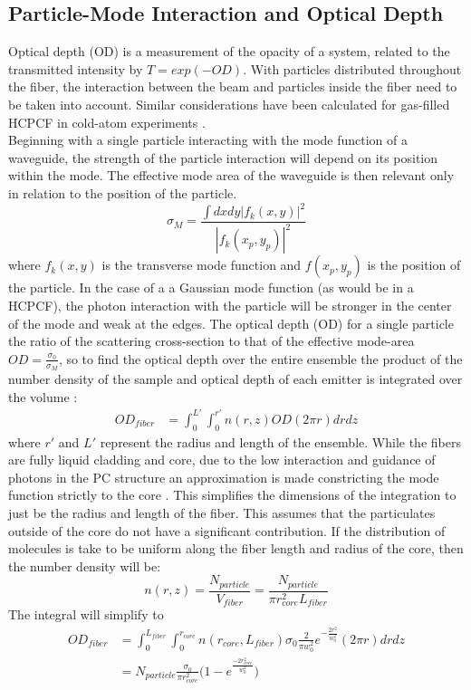 \subsection{Particle-Mode Interaction and Optical Depth}
Optical depth (OD) is a measurement of the opacity of a system, related to the transmitted intensity by $T = exp(-OD)$. With particles distributed throughout the fiber, the interaction between the beam and particles inside the fiber need to be taken into account. Similar considerations have been calculated for gas-filled HCPCF in cold-atom experiments \cite{bajcsy, hilton}.\\
Beginning with a single particle interacting with the mode function of a waveguide, the strength of the particle interaction will depend on its position within the mode\cite{domokos, mazoni}. The effective mode area of the waveguide is then relevant only in relation to the position of the particle. 
\begin{equation}
	\sigma_M = \frac{\int dxdy|f_k(x, y)|^2}{|f_k(x_p, y_p)|^2}
\end{equation}
where $f_k(x,y)$ is the transverse mode function and $f(x_p,y_p )$ is the position of the particle. In the case of a a Gaussian mode function (as would be in a HCPCF), the photon interaction with the particle will be stronger in the center of the mode and weak at the edges. The optical depth (OD) for a single particle the ratio of the scattering cross-section to that of the effective mode-area $OD =\frac{\sigma_0}{\sigma_M}$, so to find the optical depth over the entire ensemble the product of the number density of the sample and optical depth of each emitter is integrated over the volume :
\begin{equation}
	\begin{aligned}
		OD_{fiber} &= \int^{L'}_0 \int^{r'}_0 n(r, z)OD(2\pi r) dr dz 
	\end{aligned}
\end{equation}
where $r'$ and $L'$ represent the radius and length of the ensemble.  While the fibers are fully liquid cladding and core, due to the low interaction and guidance of photons in the PC structure an approximation is made constricting the mode function strictly to the core . This simplifies the dimensions of the integration to just be the radius and length of the fiber. This assumes that the particulates outside of the core do not have a significant contribution.  If the distribution of molecules is take to be uniform along the fiber length and radius of the core, then the number density will be: 
\begin{equation}
	n(r, z) = \frac{N_{particle}}{V_{fiber}} = \frac{N_{particle}}{\pi r_{core}^2L_{fiber}} 
\end{equation}
The integral will simplify to
\begin{equation}
	\begin{aligned}
		OD_{fiber} &= \int^{L_{fiber}}_0 \int^{r_{core}}_0  n(r_{core}, L_{fiber})\sigma_0 \frac{2}{\pi w_0^2}e^{-\frac{2r^2}{w_0^2}}(2\pi r) dr dz\\
		&= N_{particle}\frac{\sigma_0}{\pi r^2_{core}}\big(1-e^{\frac{-2r_{core}^2}{w_0^2}}\big)
	\label{OD}
	\end{aligned}
\end{equation}
